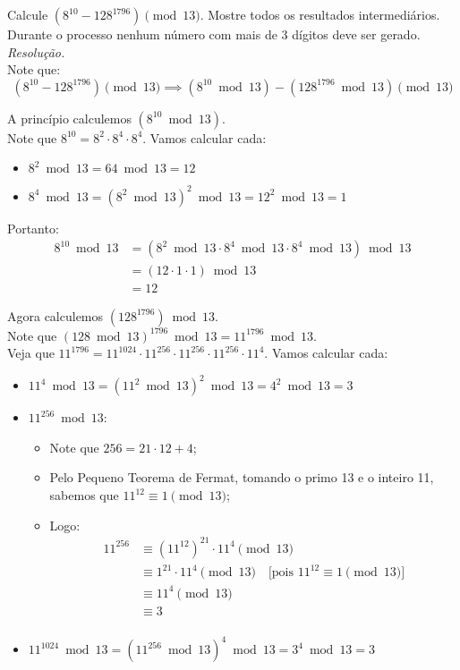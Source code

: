 Calcule $(8^{10} - 128^{1796}) \pmod{13}$. Mostre todos os resultados intermediários. Durante o processo nenhum número com mais de 3 dígitos deve ser gerado. \\
\emph{Resolução.} \\
Note que:
\begin{displaymath}
	(8^{10} - 128^{1796}) \pmod{13} \implies (8^{10} \bmod{13}) - (128^{1796} \bmod{13}) \pmod{13}
\end{displaymath}

A princípio calculemos $(8^{10} \bmod{13})$. \\
Note que $8^{10} = 8^2 \cdot 8^4 \cdot 8^4$. Vamos calcular cada:
\begin{itemize}
	\item $8^2 \bmod{13} = 64 \bmod{13} = 12$ 
	\item $8^4 \bmod{13} = (8^2 \bmod{13})^2 \bmod{13} = 12^2 \bmod{13} = 1$ 
\end{itemize}
Portanto:
\begin{align*}
	8^{10} \bmod{13} &= (8^2 \bmod{13} \cdot 8^4 \bmod{13} \cdot 8^4 \bmod{13}) \bmod{13} \\
	&= (12 \cdot 1 \cdot 1) \bmod{13} \\
	&= 12
\end{align*}

Agora calculemos $(128^{1796}) \bmod{13}$. \\
Note que $(128 \bmod{13})^{1796} \bmod{13} = 11^{1796} \bmod{13}$. \\
Veja que $11^{1796} = 11^{1024} \cdot 11^{256} \cdot 11^{256} \cdot 11^{256} \cdot 11^4$.
Vamos calcular cada:
\begin{itemize}
	\item $11^4 \bmod{13} = (11^2 \bmod{13})^2 \bmod{13} = 4^2 \bmod{13} = 3$
	\item $11^{256} \bmod{13}$:
	\begin{itemize}
		\item Note que $256 = 21 \cdot 12 + 4$;
		\item Pelo Pequeno Teorema de Fermat, tomando o primo 13 e o inteiro 11, sabemos que $11^{12} \equiv 1 \pmod{13}$;
		\item Logo:
			\begin{align*}
				11^{256} &\equiv (11^{12})^{21} \cdot 11^4 \pmod{13} \\
					&\equiv 1^{21} \cdot 11^4 \pmod{13} \quad \text{[pois $11^{12} \equiv 1 \pmod{13}$]} \\
					&\equiv 11^4 \pmod{13}  \\
					&\equiv 3 \\
			\end{align*}
	\end{itemize}
	\item $11^{1024} \bmod{13} = (11^{256} \bmod{13})^4 \bmod{13} = 3^4 \bmod{13} = 3$
\end{itemize}

